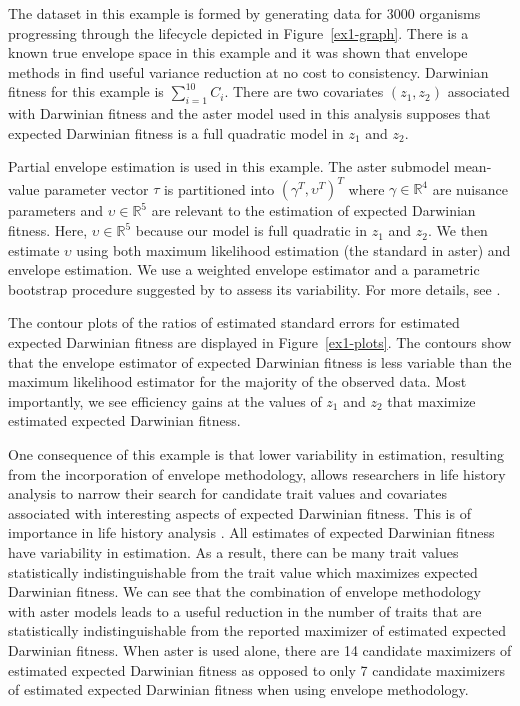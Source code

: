 \documentclass[12pt]{article}
\newcommand{\R}{\mathbb{R}}
\begin{document}
The dataset in this example is formed by generating data for 3000 organisms 
progressing through the lifecycle depicted in Figure~\ref{ex1-graph}. There 
is a known true envelope space in this example and it was shown that envelope 
methods in \citet*{eck-asterenv} find useful variance reduction at no cost to 
consistency. Darwinian fitness for this example is $\sum_{i=1}^{10}C_i$. There 
are two covariates $(z_1,z_2)$ associated with Darwinian fitness and the aster 
model used in this analysis supposes that expected Darwinian fitness is a full 
quadratic model in $z_1$ and $z_2$.

Partial envelope estimation is used in this example. The aster submodel 
mean-value parameter vector $\tau$ is partitioned into 
$(\gamma^T, \upsilon^T)^T$ where $\gamma \in \R^4$ are nuisance parameters and 
$\upsilon \in \R^5$ are relevant to the estimation of expected 
Darwinian fitness. Here, $\upsilon \in \R^5$ because our model is full 
quadratic in $z_1$ and $z_2$. We then estimate $\upsilon$ using both maximum 
likelihood estimation (the standard in aster) and envelope estimation. We use 
a weighted envelope estimator and a parametric bootstrap procedure suggested 
by \citet*{efron} to assess its variability. For more details, see 
\citet*{eck-asterenv}. 

The contour plots of the ratios of estimated standard errors for estimated 
expected Darwinian fitness are displayed in Figure~\ref{ex1-plots}. The 
contours show that the envelope estimator of expected Darwinian fitness is 
less variable than the maximum likelihood estimator for the majority of the 
observed data. Most importantly, we see efficiency gains at the values of 
$z_1$ and $z_2$ that maximize estimated expected Darwinian fitness.

One consequence of this example is that lower variability in estimation, 
resulting from the incorporation of envelope methodology, allows researchers 
in life history analysis to narrow their search for candidate trait values and 
covariates associated with interesting aspects of expected Darwinian fitness. 
This is of importance in life history analysis 
\citep*{eck-evol, shaw-fit-land}. All estimates of expected Darwinian fitness 
have variability in estimation. As a result, there can be many trait values 
statistically indistinguishable from the trait value which maximizes expected 
Darwinian fitness. We can see that the combination of envelope methodology 
with aster models leads to a useful reduction in the number of traits that are 
statistically indistinguishable from the reported maximizer of estimated 
expected Darwinian fitness. When aster is used alone, there are 14 candidate 
maximizers of estimated expected Darwinian fitness as opposed to only 7 
candidate maximizers of estimated expected Darwinian fitness when using 
envelope methodology.
\end{document}
